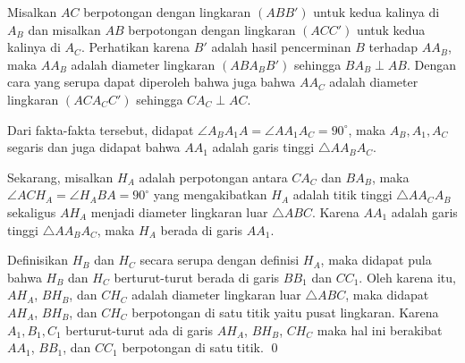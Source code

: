 \begin{center}
\end{center}
    
Misalkan $AC$ berpotongan dengan lingkaran $(ABB')$ untuk kedua kalinya di $A_B$ dan misalkan $AB$ berpotongan dengan lingkaran $(ACC')$ untuk kedua kalinya di $A_C$. Perhatikan karena $B'$ adalah hasil pencerminan $B$ terhadap $AA_B$, maka $AA_B$ adalah diameter lingkaran $(ABA_BB')$ sehingga  $BA_B \perp AB$. Dengan cara yang serupa dapat diperoleh bahwa juga bahwa $AA_C$ adalah diameter lingkaran $(ACA_CC')$ sehingga $CA_C \perp AC$.

Dari fakta-fakta tersebut, didapat $\angle A_BA_1A = \angle AA_1A_C = 90^\circ$, maka $A_B, A_1, A_C$ segaris dan juga didapat bahwa $AA_1$ adalah garis tinggi $\triangle AA_BA_C$.

Sekarang, misalkan $H_A$ adalah perpotongan antara $CA_C$ dan $BA_B$, maka $\angle ACH_A = \angle H_ABA = 90^\circ$ yang mengakibatkan $H_A$ adalah titik tinggi $\triangle AA_CA_B$ sekaligus $AH_A$ menjadi diameter lingkaran luar $\triangle ABC$. Karena $AA_1$ adalah garis tinggi $\triangle AA_BA_C$, maka $H_A$ berada di garis $AA_1$.

Definisikan $H_B$ dan $H_C$ secara serupa dengan definisi $H_A$, maka didapat pula bahwa $H_B$ dan $H_C$ berturut-turut berada di garis $BB_1$ dan $CC_1$. Oleh karena itu, $AH_A$, $BH_B$, dan $CH_C$ adalah diameter lingkaran luar $\triangle ABC$, maka didapat $AH_A$, $BH_B$, dan $CH_C$ berpotongan di satu titik yaitu pusat lingkaran. Karena $A_1,B_1,C_1$ berturut-turut ada di garis $AH_A$, $BH_B$, $CH_C$ maka hal ini berakibat $AA_1$, $BB_1$, dan $CC_1$ berpotongan di satu titik. \qed
